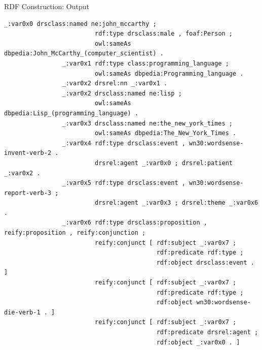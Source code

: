 \documentclass[11pt]{beamer}
\begin{document}
		\begin{frame}[fragile]{RDF Construction: Output}
			\begin{Verbatim}[fontsize=\tiny]
				_:var0x0 drsclass:named ne:john_mccarthy ;
				         rdf:type drsclass:male , foaf:Person ;
				         owl:sameAs dbpedia:John_McCarthy_(computer_scientist) .
				_:var0x1 rdf:type class:programming_language ;
				         owl:sameAs dbpedia:Programming_language .
				_:var0x2 drsrel:nn _:var0x1 .
				_:var0x2 drsclass:named ne:lisp ;
				         owl:sameAs dbpedia:Lisp_(programming_language) .
				_:var0x3 drsclass:named ne:the_new_york_times ;
				         owl:sameAs dbpedia:The_New_York_Times .
				_:var0x4 rdf:type drsclass:event , wn30:wordsense-invent-verb-2 .
				         drsrel:agent _:var0x0 ; drsrel:patient _:var0x2 .
				_:var0x5 rdf:type drsclass:event , wn30:wordsense-report-verb-3 ;
				         drsrel:agent _:var0x3 ; drsrel:theme _:var0x6 .
				_:var0x6 rdf:type drsclass:proposition , reify:proposition , reify:conjunction ;
				         reify:conjunct [ rdf:subject _:var0x7 ;
				                          rdf:predicate rdf:type ;
				                          rdf:object drsclass:event . ]
				         reify:conjunct [ rdf:subject _:var0x7 ;
				                          rdf:predicate rdf:type ;
				                          rdf:object wn30:wordsense-die-verb-1 . ]
				         reify:conjunct [ rdf:subject _:var0x7 ;
				                          rdf:predicate drsrel:agent ;
				                          rdf:object _:var0x0 . ]
			\end{Verbatim}
		\end{frame}
\end{document}
